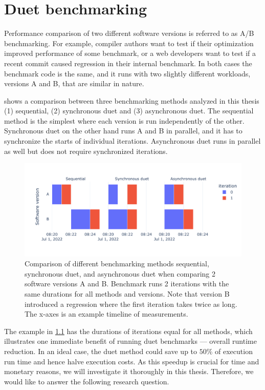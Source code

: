 \chapter{Duet benchmarking}
\label{chap:duet}

Performance comparison of two different software versions is referred to as A/B benchmarking.
For example, compiler authors want to test if their optimization improved performance of some benchmark, or a web developers want to test if a recent commit caused regression in their internal benchmark.
In both cases the benchmark code is the same, and it runs with two slightly different workloads, versions A and B, that are similar in nature.

 shows a comparison between three benchmarking methods analyzed in this thesis (1) sequential, (2) synchronous duet and (3) asynchronous duet.
The sequential method is the simplest where each version is run independently of the other.
Synchronous duet on the other hand runs A and B in parallel, and it has to synchronize the starts of individual iterations.
Asynchronous duet runs in parallel as well but does not require synchronized iterations.

\begin{figure}[!ht]
	\centering
	\includegraphics[width=.9\linewidth]{./figures/method_timeline.pdf}
	\caption{
	Comparison of different benchmarking methods sequential, synchronous duet, and asynchronous duet when comparing 2 software versions A and B.
	Benchmark runs 2 iterations with the same durations for all methods and versions.
	Note that version B introduced a regression where the first iteration takes twice as long.
	The \mbox{x-axes} is an example timeline of measurements.
	}
	\label{fig:method_timeline}
\end{figure}

The example in \cref{fig:method_timeline} has the durations of iterations equal for all methods, which illustrates one immediate benefit of running duet benchmarks --- overall runtime reduction.
In an ideal case, the duet method could save up to $50\%$ of execution run time and hence halve execution costs.
As this speedup is crucial for time and monetary reasons, we will investigate it thoroughly in this thesis.
Therefore, we would like to answer the following research question.


